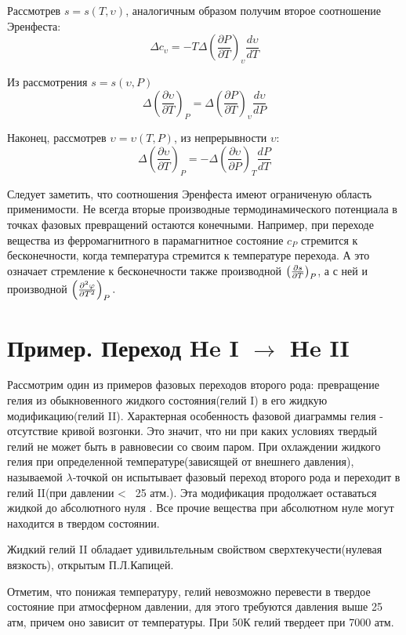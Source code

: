 \documentclass[a4paper,12pt]{article}
\begin{document}
Рассмотрев $s = s(T,\upsilon)$, аналогичным образом получим второе соотношение Эренфеста:
\[\Delta c_{\upsilon} = -T \Delta \left( \frac{\partial P}{\partial T} \right)_{\upsilon} \frac{d\upsilon}{dT}\]

Из рассмотрения $s = s(\upsilon, P)$
\[\Delta \left( \frac{\partial \upsilon}{\partial T} \right)_P = \Delta \left( \frac{\partial P}{\partial T} \right)_{\upsilon} \frac{d\upsilon}{dP}\]

Наконец, рассмотрев $\upsilon = \upsilon(T,P)$, из непрерывности $\upsilon$:
\[\Delta \left( \frac{\partial \upsilon}{\partial T} \right)_P = - \Delta \left( \frac{\partial \upsilon}{\partial P} \right)_T \frac{dP}{dT}\]

Следует заметить, что соотношения Эренфеста имеют ограниченую область применимости. Не всегда вторые производные термодинамического потенциала в точках фазовых превращений остаются конечными. Например, при переходе вещества из ферромагнитного в парамагнитное состояние $c_P$ стремится к бесконечности, когда температура стремится к температуре перехода. А это означает стремление к бесконечности также производной $\left({{{\partial s} \over {\partial T}}}\right)_{P}$, а с ней и производной $\left({{{\partial ^{2}\varphi } \over {\partial T^{2}}}}\right)_{P}.$\\


\section{Пример. Переход He I $\rightarrow$ He II}
Рассмотрим один из примеров фазовых переходов второго рода: превращение гелия из обыкновенного жидкого состояния(гелий I) в его жидкую модификацию(гелий II). Характерная особенность фазовой диаграммы гелия - отсутствие кривой возгонки. Это значит, что ни при каких условиях твердый гелий не может быть в равновесии со своим паром. При охлаждении жидкого гелия при определенной температуре(зависящей от внешнего давления), называемой $\lambda$-точкой он испытывает фазовый переход второго рода и переходит в гелий II(при давлении < ~25 атм.). Эта модификация продолжает оставаться жидкой до абсолютного нуля . Все прочие вещества при абсолютном нуле могут находится в твердом состоянии. 

Жидкий гелий II обладает удивильтельным свойством сверхтекучести(нулевая вязкость), открытым П.Л.Капицей.

Отметим, что понижая температуру, гелий невозможно перевести в твердое состояние при атмосферном давлении, для этого требуются давления выше 25 атм, причем оно зависит от температуры. При 50К гелий твердеет при 7000 атм.
\end{document}
